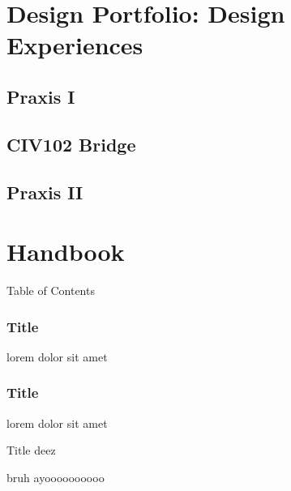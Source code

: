 \documentclass[aspectratio=1610]{beamer}
\begin{document}
\section{Design Portfolio: Design Experiences}
\subsection{Praxis I}
\subsection{CIV102 Bridge}
\subsection{Praxis II}

\section*{Handbook}
{
\begin{frame}{Table of Contents}
\end{frame}
}

\begin{frame}
    \frametitle{Title}
    lorem dolor sit amet
\end{frame}

\begin{frame}
    \frametitle{Title}
    lorem dolor sit amet
\end{frame}

\begin{frame}{Title deez}

\end{frame}

\begin{frame}{b}{ruh}
    ayoooooooooo

\end{frame}
\end{document}
